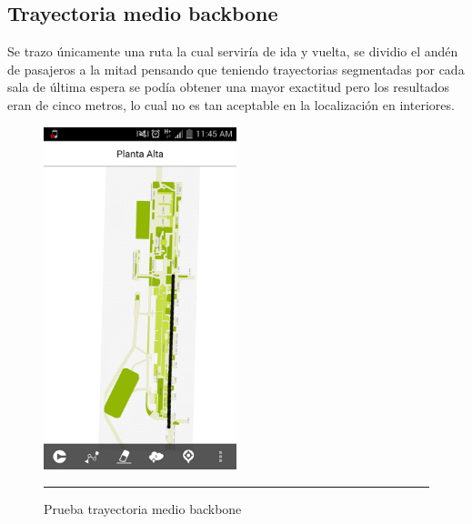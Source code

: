 \subsection{Trayectoria medio backbone}
Se trazo únicamente una ruta la cual serviría de ida y vuelta, se dividio el andén de pasajeros a la mitad pensando que teniendo 
trayectorias segmentadas por cada sala de última espera se podía obtener una mayor exactitud pero los resultados eran de cinco metros, lo cual no es tan aceptable en la localización en interiores.
\begin{figure}[h]
	\centering
		\includegraphics[width=0.5\textwidth]{Figuras/medioback.png}
		\rule{30em}{0.5pt}
	\caption[Prueba trayectoria medio backbone]{Prueba trayectoria medio backbone}
	\label{fig:vistaPruebaMedioBack}
\end{figure}
\clearpage

